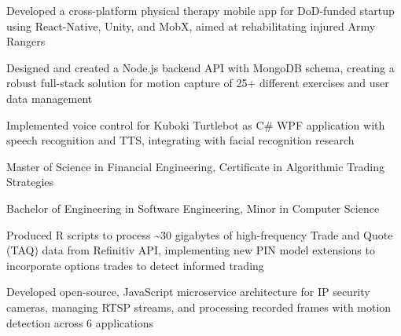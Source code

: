 \documentclass[10pt,letterpaper]{article}
\begin{document}
\begin{highlights}
\item Developed a cross-platform physical therapy mobile app for DoD-funded startup using React-Native, Unity, and MobX, aimed at rehabilitating injured Army Rangers
\item Designed and created a Node.js backend API with MongoDB schema, creating a robust full-stack solution for motion capture of 25+ different exercises and user data management
\end{highlights}

\begin{highlights}
\item Implemented voice control for Kuboki Turtlebot as C\# WPF application with speech recognition and TTS, integrating with facial recognition research
\end{highlights}

\begin{highlights}
\item Master of Science in Financial Engineering, Certificate in Algorithmic Trading Strategies
\item Bachelor of Engineering in Software Engineering, Minor in Computer Science
\end{highlights}

\begin{highlights}
\item Produced R scripts to process \textasciitilde30 gigabytes of high-frequency Trade and Quote (TAQ) data from Refinitiv API, implementing new PIN model extensions to incorporate options trades to detect informed trading
\end{highlights}

\begin{highlights}
\item Developed open-source, JavaScript microservice architecture for IP security cameras, managing RTSP streams, and processing recorded frames with motion detection across 6 applications
\end{highlights}
\end{document}
